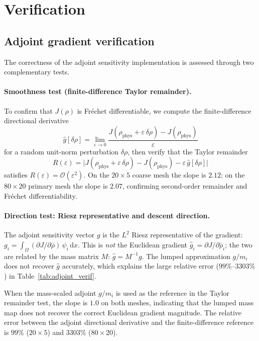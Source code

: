 \section{Verification}
\label{sec:verification}

\subsection{Adjoint gradient verification}
\label{sec:taylor_test}
The correctness of the adjoint sensitivity implementation is assessed
through two complementary tests.

\paragraph{Smoothness test (finite-difference Taylor remainder).}
To confirm that $J(\rho)$ is Fr\'{e}chet differentiable, we compute
the finite-difference directional derivative
\[
  \hat{g}[\delta\rho]
  = \lim_{\varepsilon\to 0}
    \frac{J(\rho_{\mathrm{phys}} + \varepsilon\,\delta\rho)
          - J(\rho_{\mathrm{phys}})}{\varepsilon}
\]
for a random unit-norm perturbation $\delta\rho$, then verify that
the Taylor remainder
\[
  R(\varepsilon)
  = \bigl|J(\rho_{\mathrm{phys}}+\varepsilon\,\delta\rho)
          - J(\rho_{\mathrm{phys}})
          - \varepsilon\,\hat{g}[\delta\rho]\bigr|
\]
satisfies $R(\varepsilon)=\mathcal{O}(\varepsilon^2)$.
On the $20\times5$ coarse mesh the slope is $2.12$;
on the $80\times20$ primary mesh the slope is $2.07$,
confirming second-order remainder and Fr\'{e}chet differentiability.

\paragraph{Direction test: Riesz representative and descent direction.}
The adjoint sensitivity vector $g$ is the $L^2$ Riesz representative
of the gradient:
$g_i = \int_\Omega (\partial J/\partial\bar\rho)\,\psi_i\,\mathrm{d}x$.
This is \emph{not} the Euclidean gradient $\hat{g}_i =
\partial J/\partial\bar\rho_i$; the two are related by the
mass matrix $M$: $\hat{g} = M^{-1}g$.
The lumped approximation $g/m_i$ does not recover $\hat{g}$
accurately, which explains the large relative error
($99\%$--$3303\%$) in Table~\ref{tab:adjoint_verif}.

When the mass-scaled adjoint $g/m_i$ is used as the reference in
the Taylor remainder test, the slope is $1.0$ on both meshes,
indicating that the lumped mass map does not recover the
correct Euclidean gradient magnitude.
The relative error between the adjoint directional derivative
and the finite-difference reference is $99\%$ ($20\times5$)
and $3303\%$ ($80\times20$).

